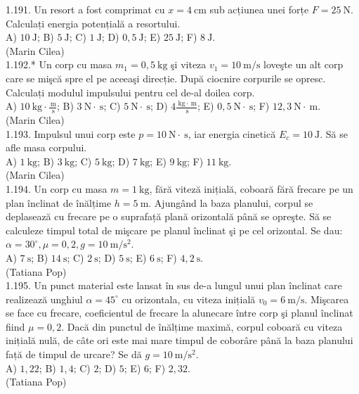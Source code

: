 1.191. Un resort a fost comprimat cu $x=4 \mathrm{~cm}$ sub acțiunea unei forțe $F=25 \mathrm{~N}$. Calculați energia potențială a resortului.\\ A) $10 \mathrm{~J}$; B) $5 \mathrm{~J}$; C) $1 \mathrm{~J}$; D) $0,5 \mathrm{~J}$; E) $25 \mathrm{~J}$; F) $8 \mathrm{~J}$.\\ (Marin Cilea)\\

1.192.* Un corp cu masa $m_{1}=0,5 \mathrm{~kg}$ şi viteza $v_{1}=10 \mathrm{~m} / \mathrm{s}$ loveşte un alt corp care se mişcă spre el pe aceeaşi direcție. După ciocnire corpurile se opresc. Calculați modulul impulsului pentru cel de-al doilea corp.\\ A) $10 \mathrm{~kg} \cdot \frac{\mathrm{~m}}{\mathrm{~s}}$; B) $3 \mathrm{~N} \cdot \mathrm{~s}$; C) $5 \mathrm{~N} \cdot \mathrm{~s}$; D) $4 \frac{\mathrm{~kg} \cdot \mathrm{~m}}{\mathrm{~s}}$; E) $0,5 \mathrm{~N} \cdot \mathrm{~s}$; F) $12,3 \mathrm{~N} \cdot \mathrm{~m}$.\\ (Marin Cilea)\\

1.193. Impulsul unui corp este $p=10 \mathrm{~N} \cdot \mathrm{~s}$, iar energia cinetică $E_{c}=10 \mathrm{~J}$. Să se afle masa corpului.\\ A) $1 \mathrm{~kg}$; B) $3 \mathrm{~kg}$; C) $5 \mathrm{~kg}$; D) $7 \mathrm{~kg}$; E) $9 \mathrm{~kg}$; F) $11 \mathrm{~kg}$.\\ (Marin Cilea)\\

1.194. Un corp cu masa $m=1 \mathrm{~kg}$, fără viteză inițială, coboară fără frecare pe un plan înclinat de înălțime $h=5 \mathrm{~m}$. Ajungând la baza planului, corpul se deplasează cu frecare pe o suprafață plană orizontală până se opreşte. Să se calculeze timpul total de mişcare pe planul înclinat şi pe cel orizontal. Se dau: $\alpha=30^{\circ}, \mu=0,2, g=10 \mathrm{~m} / \mathrm{s}^{2}$.\\ A) $7\mathrm{~s}$; B) $14 \mathrm{~s}$; C) $2 \mathrm{~s}$; D) $5 \mathrm{~s}$; E) $6 \mathrm{~s}$; F) $4,2 \mathrm{~s}$.\\ (Tatiana Pop)\\

1.195. Un punct material este lansat în sus de-a lungul unui plan înclinat care realizează unghiul $\alpha=45^{\circ}$ cu orizontala, cu viteza inițială $v_{0}=6 \mathrm{~m} / \mathrm{s}$. Mişcarea se face cu frecare, coeficientul de frecare la alunecare între corp şi planul înclinat fiind $\mu=0,2$. Dacă din punctul de înălțime maximă, corpul coboară cu viteza inițială nulă, de câte ori este mai mare timpul de coborâre până la baza planului față de timpul de urcare? Se dă $g=10 \mathrm{~m} / \mathrm{s}^{2}$. \\ A) $1,22$; B) $1,4$; C) $2$; D) $5$; E) $6$; F) $2,32$.\\ (Tatiana Pop)\\


